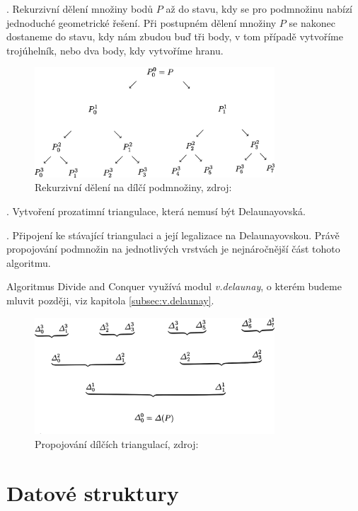 \documentclass[12pt,a4paper]{article}
\begin{document}
. Rekurzivní dělení množiny bodů $P$ až do stavu, kdy se pro podmnožinu nabízí jednoduché geometrické řešení. Při postupném dělení množiny $P$ se nakonec dostaneme do stavu, kdy nám zbudou buď tři body, v tom případě vytvoříme trojúhelník, nebo dva body, kdy vytvoříme hranu.
\begin{figure}[h!]
\centering
\includegraphics[width=0.8\textwidth]{img/div_n_conq.png}
\caption{Rekurzivní dělení na dílčí podmnožiny, zdroj: \cite{triangulation}}
\label{fig:div_n_conq}
\end{figure}

. Vytvoření prozatimní triangulace, která nemusí být Delaunayovská.

. Připojení ke stávající triangulaci a její legalizace na Delaunayovskou. Právě propojování podmnožin na jednotlivých vrstvách je nejnáročnější část tohoto algoritmu.

\bigskip
Algoritmus Divide and Conquer využívá modul \emph{v.delaunay}, o kterém budeme mluvit později, viz kapitola \ref{subsec:v.delaunay}.

\newpage
\begin{figure}[h!]
\centering
\includegraphics[width=0.8\textwidth]{img/merge.png}
\caption{Propojování dílčích triangulací, zdroj: \cite{triangulation}}
\label{fig:merge}
\end{figure}


\newpage
\section{Datové struktury}
\label{sec:data_struct}
\end{document}
